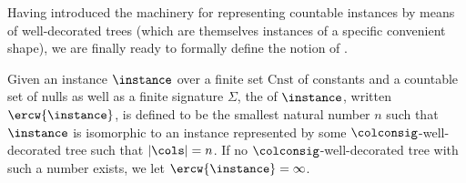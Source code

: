 Having introduced the machinery for representing countable instances by means of well-decorated trees (which are themselves instances of a specific convenient shape), we are finally ready to formally define the notion of \partitionwidth{}.

\begin{definition}
Given an instance $\instance$ over a finite set $\mathrm{Cnst}$ of constants and a countable set of nulls as well as a finite signature $\Sigma$, the \emph{\ercwidth{}} of $\instance$, written $\ercw{\instance}$, is defined to be the smallest natural number $n$ such that $\instance$ is isomorphic to an instance represented by some $\colconsig$-well-decorated tree such that $|\cols|  =n$.
If no $\colconsig$-well-decorated tree with such a number exists, we let \mbox{$\ercw{\instance}= \infty$}.
\end{definition}


%


